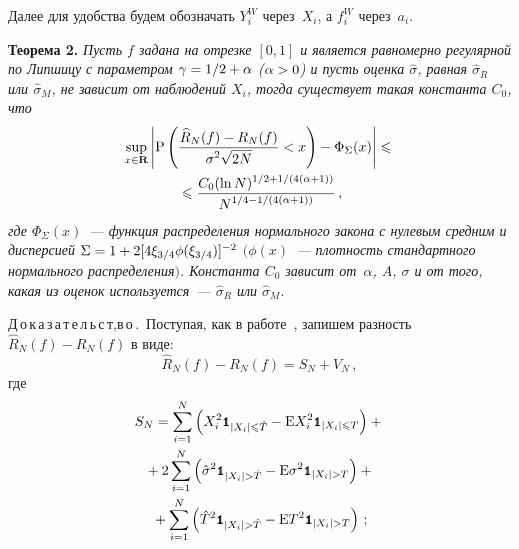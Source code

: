 \begin{multicols}{2}
Далее для удобства будем обозначать $Y_i^W$ через~$X_i$, а $f_i^W$ через~$a_i$.

\medskip

\noindent
\textbf{Теорема 2.} \textit{Пусть $f$ задана на отрезке $[0,1]$ и является 
равномерно регулярной по Липшицу с параметром $\gamma\hm={1}/{2}+\alpha$ 
($\alpha\hm>0$) и пусть оценка $\hat{\sigma}$, равная $\hat{\sigma}_{R}$ или $\hat{\sigma}_{M}$, 
не зависит от наблюдений $X_i$, тогда существует такая константа $C_0$, что}
\begin{multline}
\sup\limits_{x\in\mathbf{R}}\left\vert\mbox{P}\left(
\displaystyle\frac{\displaystyle \widehat{R}_N(f)-R_N(f)\mathstrut}{\displaystyle \sigma^2\sqrt{2N}\mathstrut}<x\right)-
\Phi_\Sigma(x)\right\vert\leqslant{}\\
{}\leqslant\displaystyle\frac{\displaystyle C_0(\ln N)^{{1}/{2}+{1}/(4(\alpha+1))}\mathstrut}{\displaystyle N^{{1}/{4}-
{1}/(4(\alpha+1))}\mathstrut}\,,\label{e7sh}
\end{multline}
\textit{где $\Phi_\Sigma(x)$~--- функция распределения нормального закона с нулевым средним и 
дисперсией $\Sigma\hm=1\hm+2[4\xi_{3/4}\phi(\xi_{3/4})]^{-2}$ $($$\phi(x)$~--- 
плотность стандартного нормального распределения$)$. Константа $C_0$ зависит от~$\alpha$, 
$A$, $\sigma$ и от того, какая из оценок используется~--- 
$\hat{\sigma}_{R}$ или $\hat{\sigma}_{M}$}.

\medskip

\noindent
Д\,о\,к\,а\,з\,а\,т\,е\,л\,ь\,с\,т,в\,о\,.\ Поступая, как в работе~\cite{8sh}, 
запишем разность $\widehat{R}_N(f)-R_N(f)$ в виде:
$$
\widehat{R}_N(f)-R_N(f)=S_N+V_N\,,
$$
где
\begin{multline*}
S_N=\sum\limits_{i=1}^{N}\left(X_i^2\Ik_{|X_i|\leqslant 
\hat{T}}-\mbox{E}X_i^2\Ik_{|X_i|\leqslant T}\right)+{}\\
{}+2\sum\limits_{i=1}^{N}\left(\hat{\sigma}^2\Ik_{|X_i|> \hat{T}}-
\mbox{E}\sigma^2\Ik_{|X_i|> T}\right)+{}
\\
{}+\sum_{i=1}^{N}\left(\hat{T}^2\Ik_{|X_i|> \hat{T}}-
\mbox{E}T^2\Ik_{|X_i|> T}\right)\,;
\end{multline*}

\vspace*{-3pt}


\end{multicols}
